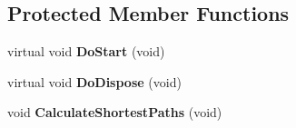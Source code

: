 \subsection*{\-Protected \-Member \-Functions}
\begin{DoxyCompactItemize}
\item 
\hypertarget{classns3_1_1PLC__Graph_ac8a6a73c5a49f4b55c72fc779ad89fda}{virtual void {\bfseries \-Do\-Start} (void)}\label{classns3_1_1PLC__Graph_ac8a6a73c5a49f4b55c72fc779ad89fda}

\item 
\hypertarget{classns3_1_1PLC__Graph_ab6d36d72337828e7691210a4f97d6aad}{virtual void {\bfseries \-Do\-Dispose} (void)}\label{classns3_1_1PLC__Graph_ab6d36d72337828e7691210a4f97d6aad}

\item 
\hypertarget{classns3_1_1PLC__Graph_aa521edba859d97fe0486768367dcef25}{void {\bfseries \-Calculate\-Shortest\-Paths} (void)}\label{classns3_1_1PLC__Graph_aa521edba859d97fe0486768367dcef25}

\end{DoxyCompactItemize}
